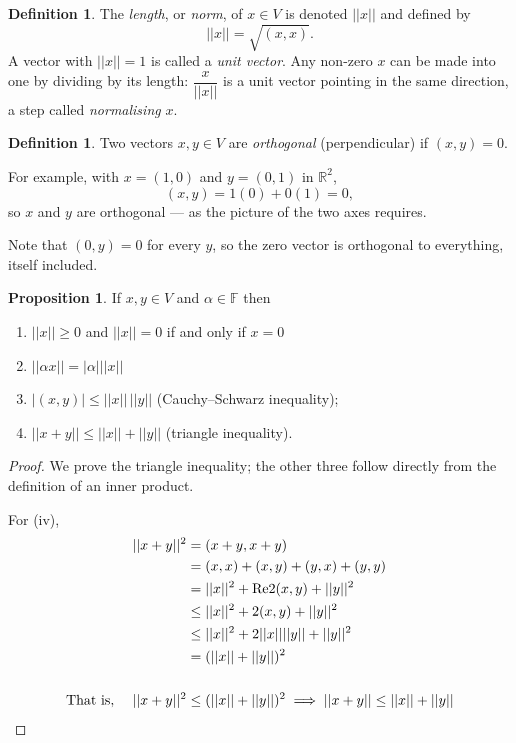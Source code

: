 \documentclass[11pt,a4paper]{article}
\theoremstyle{definition}
\newtheorem{defn}[thm]{Definition}
\newtheorem{prop}[thm]{Proposition}
\begin{document}
\begin{defn}
The \emph{length}, or \emph{norm}, of $x\in V$ is denoted $||x||$ and defined by
$$||x||=\sqrt{(x,x)}.$$
A vector with $||x||=1$ is called a \emph{unit vector}. Any non-zero $x$ can be
made into one by dividing by its length: $\dfrac{x}{||x||}$ is a unit vector
pointing in the same direction, a step called \emph{normalising} $x$.
\end{defn}

\begin{defn}
Two vectors $x,y\in V$ are \emph{orthogonal} (perpendicular) if $(x,y)=0$.

For example, with $x=(1,0)$ and $y=(0,1)$ in $\mathbb{R}^2$,
$$(x,y)=1(0)+0(1)=0,$$
so $x$ and $y$ are orthogonal --- as the picture of the two axes requires.

Note that $(0,y)=0$ for every $y$, so the zero vector is orthogonal to
everything, itself included.
\end{defn}

\begin{prop}
If $x,y\in V$ and $\alpha \in \mathbb{F}$ then
\begin{enumerate}
\item[i.] $||x||\geq 0$ and $||x||=0$ if and only if $x=0$
\item[ii.] $||\alpha x||=|\alpha|||x||$
\item[iii.] $|(x,y)|\leq ||x||\,||y||$ \quad(Cauchy--Schwarz inequality);
\item[iv.] $||x+y||\leq ||x||+||y||$ \quad(triangle inequality).
\end{enumerate}
\end{prop}


\begin{proof}
We prove the triangle inequality; the other three follow directly from the definition of an inner product.

For (iv), 
\begin{align*}
||x+y||^2 &=(x+y,x+y)\\
          &=(x,x)+(x,y)+(y,x)+(y,y)\\
          &=||x||^2+\text{Re}2(x,y)+||y||^2\\
          &\leq ||x||^2+2(x,y)+||y||^2\\
          &\leq ||x||^2+2||x||||y||+||y||^2\\
          &=(||x||+||y||)^2\\\\
\text{That is},\hspace{0.4cm} ||x+y||^2 &\leq (||x||+||y||)^2\implies ||x+y||\leq ||x||+||y||
\end{align*}
\end{proof}
\end{document}
